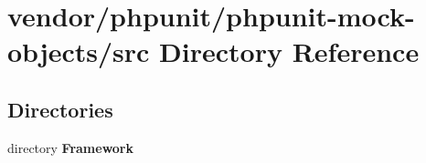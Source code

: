 \section{vendor/phpunit/phpunit-\/mock-\/objects/src Directory Reference}
\label{dir_889e3d30473d463d3fcef316789f4470}
\subsection*{Directories}
\begin{DoxyCompactItemize}
\item 
directory {\bf Framework}
\end{DoxyCompactItemize}
